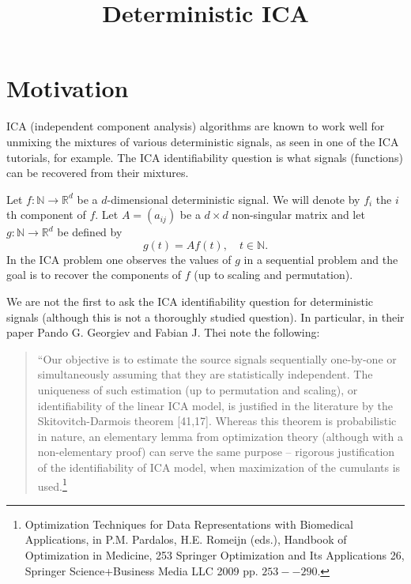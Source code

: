 \documentclass[english]{article} %
\title{Deterministic ICA}
\author{
}
\newcommand{\ra}{\rightarrow}
\newcommand{\real}{\mathbb{R}}
\renewcommand{\natural}{\mathbb{N}}
\theoremstyle{plain}
\theoremstyle{remark}
\theoremstyle{claim}
\theoremstyle{plain}
\begin{document}
\maketitle


\begin{abstract}

\end{abstract}

\section{Motivation}
\label{sec:motivation}
ICA (independent component analysis) algorithms are known to work well for unmixing the mixtures of various deterministic signals, as seen in one of the ICA tutorials, for example.
The ICA identifiability question is what signals (functions) can be recovered from their mixtures.

Let $f:\natural \ra \real^d$ be a $d$-dimensional deterministic signal. We will denote by $f_i$ the $i$th component of $f$.
Let $A = (a_{ij})$ be a $d\times d$ non-singular matrix and let $g:\natural \ra \real^d$ be defined by
\[
g(t) = A f(t), \quad t\in \natural.
\]
In the ICA problem one observes the values of $g$ in a sequential problem and the goal is to recover the components of $f$ (up to scaling and permutation).

We are not the first to ask the ICA identifiability question for deterministic signals (although this is not a thoroughly studied question).
In particular, in their paper Pando G. Georgiev and Fabian J. Thei note the following:
\begin{quote}
 ``Our objective is to estimate the source signals sequentially one-by-one or simultaneously assuming that they are statistically independent.
The uniqueness of such estimation (up to permutation and scaling), or identifiability of the linear ICA model, is justified in the literature by the Skitovitch-Darmois theorem [41,17].
 Whereas this theorem is probabilistic in nature, an elementary lemma from optimization theory (although with a non-elementary proof) can serve the same purpose -- rigorous justification of the identifiability of ICA model, when maximization of the cumulants is used.\footnote{
Optimization Techniques for Data Representations with Biomedical Applications, in
P.M. Pardalos, H.E. Romeijn (eds.), Handbook of Optimization in Medicine,	253 Springer Optimization and Its Applications 26,  Springer Science+Business Media LLC 2009
pp. $253--290$.}
\end{quote}
\end{document}
